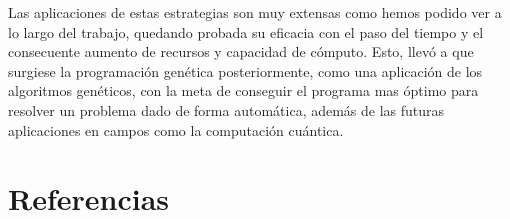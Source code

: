 \documentclass[12pt]{article} \usepackage[utf8x]{inputenc}
\begin{document}
Las aplicaciones de estas estrategias son muy extensas como hemos podido ver a lo largo 
del trabajo, quedando probada su eficacia con el paso del tiempo y el consecuente aumento 
de recursos y capacidad de cómputo. Esto, llevó a que surgiese la programación genética 
posteriormente, como una aplicación de los algoritmos genéticos, con la meta de conseguir el 
programa mas óptimo para resolver un problema dado de forma automática, además de las futuras 
aplicaciones en campos como la computación cuántica.

\section{Referencias}
\end{document}
